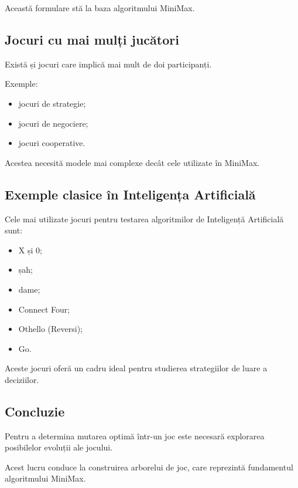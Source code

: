 \documentclass[12pt,a4paper]{article}
\begin{document}
Această formulare stă la baza algoritmului MiniMax.

\subsection{Jocuri cu mai mulți jucători}

Există și jocuri care implică mai mult de doi participanți.

Exemple:

\begin{itemize}
\item jocuri de strategie;
\item jocuri de negociere;
\item jocuri cooperative.
\end{itemize}

Acestea necesită modele mai complexe decât cele utilizate în MiniMax.

\subsection{Exemple clasice în Inteligența Artificială}

Cele mai utilizate jocuri pentru testarea algoritmilor de Inteligență Artificială sunt:

\begin{itemize}
\item X și 0;
\item șah;
\item dame;
\item Connect Four;
\item Othello (Reversi);
\item Go.
\end{itemize}

Aceste jocuri oferă un cadru ideal pentru studierea strategiilor de luare a deciziilor.

\subsection{Concluzie}

Pentru a determina mutarea optimă într-un joc este necesară explorarea posibilelor evoluții ale jocului.

Acest lucru conduce la construirea arborelui de joc, care reprezintă fundamentul algoritmului MiniMax.
\end{document}
